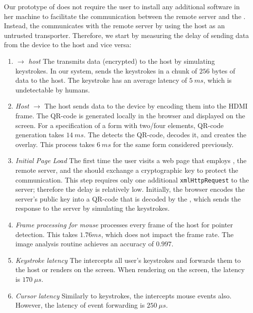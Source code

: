 Our prototype of \name does not require the user to install any additional software in her machine to facilitate the communication between the remote server and the \device. Instead, the \device communicates with the remote server by using the host as an untrusted transporter. Therefore, we start by measuring the delay of sending data from the device to the host and vice versa:

\begin{enumerate}
  \item \emph{\device $\rightarrow$ host} The \device transmits data (encrypted) to the host by simulating keystrokes. In our system, \device sends the keystrokes in a chunk of $256$ bytes of data to the host. The keystroke has an average latency of $5\ ms$, which is undetectable by humans.  


\item \emph{Host $\rightarrow$ \device} The host sends data to the device by encoding them into the HDMI frame. The QR-code is generated locally in the browser and displayed on the screen. For a specification of a form with two/four elements, QR-code generation takes $14\ ms$. The \device detects the QR-code, decodes it, and creates the overlay. This process takes $6\ ms$ for the same form considered previously.
 
 \item \emph{Initial Page Load} The first time the user visits a web page that employs \name, the remote server, and the \device should exchange a cryptographic key to protect the communication. This step requires only one additional \texttt{xmlHttpRequest} to the server; therefore the delay is relatively low. Initially, the browser encodes the server's public key into a QR-code that is decoded by the \device, which sends the response to the server by simulating the keystrokes.


\item \emph{Frame processing for mouse} \device processes every frame of the host for pointer detection. This takes $1.76 ms$, which does not impact the frame rate. The image analysis routine achieves an accuracy of $0.997$. 


\item \emph{Keystroke latency} The \device intercepts all user's keystrokes and forwards them to the host or renders on the screen. When rendering on the screen, the latency is $170\ \mu s$.


\item \emph{Cursor latency} Similarly to keystrokes, the \device intercepts mouse events also. However, the latency of event forwarding is $250\ \mu s$.


\end{enumerate}

